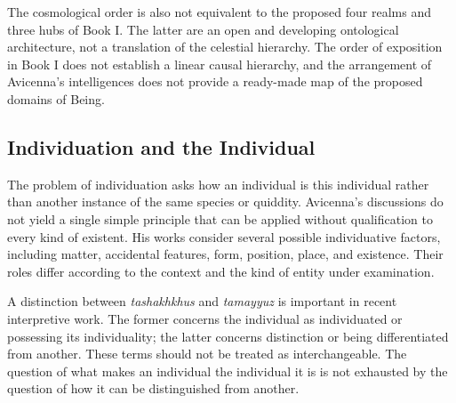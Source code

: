 \label{para:VS.B01.P01.C08.S13.SS11.P005}

The cosmological order
is also not equivalent
to the proposed
four realms and
three hubs of Book I.
The latter are
an open and developing
ontological architecture,
not a translation
of the celestial
hierarchy. The order
of exposition in
Book I does not
establish a linear
causal hierarchy,
and the arrangement
of Avicenna's intelligences
does not provide
a ready-made map
of the proposed
domains of Being.



\subsection{Individuation and the Individual}
\label{subsec:ch08-avicenna-individuation}

\label{para:VS.B01.P01.C08.S13.SS12.P001}

The problem of individuation
asks how an individual
is this individual
rather than another
instance of the same
species or quiddity.
Avicenna's discussions
do not yield a single
simple principle that
can be applied without
qualification to every
kind of existent.
His works consider
several possible
individuative factors,
including matter,
accidental features,
form, position,
place, and existence.
Their roles differ
according to the
context and the
kind of entity
under examination.
\citep[Ilahiyyat, V.1--2]{AvicennaMetaphysics}

\label{para:VS.B01.P01.C08.S13.SS12.P002}

A distinction between
\textit{tashakhkhus}
and \textit{tamayyuz}
is important in recent
interpretive work.
The former concerns
the individual as
individuated or
possessing its
individuality; the
latter concerns
distinction or
being differentiated
from another. These
terms should not
be treated as
interchangeable. The
question of what
makes an individual
the individual it
is is not exhausted
by the question
of how it can
be distinguished
from another.
\citep{PournamdarAvicennaIndividuation2025}

\label{para:VS.B01.P01.C08.S13.SS12.P003}

